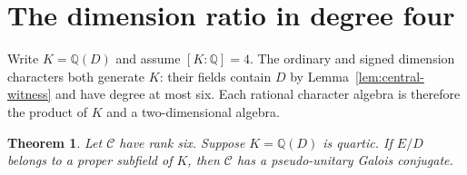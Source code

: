 \documentclass[11pt,reqno]{amsart}
\newtheorem{theorem}{Theorem}[section]
\theoremstyle{remark}\newtheorem{remark}[theorem]{Remark}
\numberwithin{equation}{section}
\begin{document}
\section{The dimension ratio in degree four}\label{sec:guide-quarticdesc}
Write $K=\mathbb Q(D)$ and assume $[K:\mathbb Q]=4$. The ordinary
and signed dimension characters both generate $K$: their fields contain
$D$ by Lemma~\ref{lem:central-witness} and have degree at most six. Each rational character
algebra is therefore the product of $K$ and a two-dimensional algebra.

\begin{theorem}\label{thm:all-proper-quartic}
Let $\mathcal C$ have rank six. Suppose $K=\mathbb Q(D)$ is
quartic. If $E/D$ belongs to a proper
subfield of $K$, then $\mathcal C$ has a pseudo-unitary Galois
conjugate.
\end{theorem}
\end{document}
